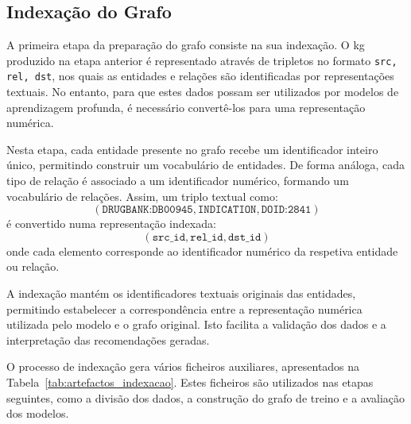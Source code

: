 \subsection{Indexação do Grafo}
\label{subsec:indexacao-grafo}
A primeira etapa da preparação do grafo consiste na sua indexação. O \acrshort{kg} produzido na etapa anterior é representado através de tripletos no formato \texttt{src, rel, dst}, nos quais as entidades e relações são identificadas por representações textuais. No entanto, para que estes dados possam ser utilizados por modelos de aprendizagem profunda, é necessário convertê-los para uma representação numérica.

Nesta etapa, cada entidade presente no grafo recebe um identificador inteiro único, permitindo construir um vocabulário de entidades. De forma análoga, cada tipo de relação é associado a um identificador numérico, formando um vocabulário de relações. Assim, um triplo textual como:
\[(\texttt{DRUGBANK:DB00945}, \texttt{INDICATION}, \texttt{DOID:2841})\]
é convertido numa representação indexada:
\[(\texttt{src\_id}, \texttt{rel\_id}, \texttt{dst\_id})\]
onde cada elemento corresponde ao identificador numérico da respetiva entidade ou relação.

A indexação mantém os identificadores textuais originais das entidades, permitindo estabelecer a correspondência entre a representação numérica utilizada pelo modelo e o grafo original. Isto facilita a validação dos dados e a interpretação das recomendações geradas.

O processo de indexação gera vários ficheiros auxiliares, apresentados na Tabela~\ref{tab:artefactos_indexacao}. Estes ficheiros são utilizados nas etapas seguintes, como a divisão dos dados, a construção do grafo de treino e a avaliação dos modelos.

